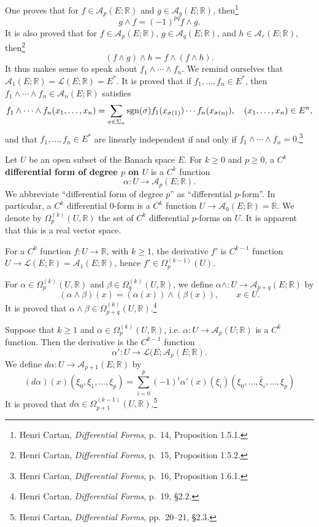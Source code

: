 \documentclass{article}
\newcommand{\sgn}{\ensuremath\mathrm{sgn}}
\theoremstyle{definition}
\theoremstyle{definition}
\begin{document}
One proves that for $f \in \mathscr{A}_p(E;\mathbb{R})$ and $g \in \mathscr{A}_q(E;\mathbb{R})$,
then\footnote{Henri Cartan,
{\em Differential Forms}, p.~14, Proposition 1.5.1.}
\[
g \wedge f = (-1)^{pq} f \wedge g.
\]
It is also proved that for $f \in \mathscr{A}_p(E;\mathbb{R})$, 
$g \in \mathscr{A}_q(E;\mathbb{R})$, and
$h \in \mathscr{A}_r(E;\mathbb{R})$, then\footnote{Henri Cartan,
{\em Differential Forms}, p.~15, Proposition 1.5.2.}
\[
(f \wedge g) \wedge h = f \wedge (f \wedge h).
\]
It thus makes sense to speak about $f_1 \wedge  \cdots \wedge f_n$. 
We remind ourselves that $\mathscr{A}_1(E;\mathbb{R})=\mathscr{L}(E;\mathbb{R})=E^*$.
It is proved that if $f_1,\ldots,f_n \in E^*$, then $f_1 \wedge \cdots \wedge f_n
\in \mathscr{A}_n(E;\mathbb{R})$ satisfies
\[
f_1 \wedge \cdots \wedge f_n (x_1,\ldots,x_n) = \sum_{\sigma \in \Sigma_n}
\sgn(\sigma) f_1(x_{\sigma(1)}) \cdots f_n(x_{\sigma(n)}),
\quad (x_1,\ldots,x_n) \in E^n,
\]
and that $f_1,\ldots,f_n \in E^*$ are linearly independent if and only if
$f_1 \wedge \cdots \wedge f_n=0$.\footnote{Henri Cartan,
{\em Differential Forms}, p.~16, Proposition 1.6.1.}


Let $U$ be an open subset of the Banach space $E$. 
For $k \geq 0$ and $p \geq 0$, a \textbf{$C^k$ differential form of degree $p$ on $U$}
is a $C^k$ function
\[
\alpha: U \to \mathscr{A}_p(E;\mathbb{R}). 
\]
We abbreviate ``differential form of degree $p$'' as ``differential $p$-form''.
In particular, a $C^k$ differential $0$-form is a $C^k$ function $U \to \mathscr{A}_0(E;\mathbb{R})
=\mathbb{R}$.
We denote by $\Omega_p^{(k)}(U,\mathbb{R})$ the set of $C^k$ differential
$p$-forms on $U$. It is apparent that this is a real vector space. 

For a $C^k$ function $f:U \to \mathbb{R}$, with $k \geq 1$,
the derivative $f'$ is $C^{k-1}$ function
$U \to \mathscr{L}(E;\mathbb{R})=\mathscr{A}_1(E;\mathbb{R})$, hence
$f' \in \Omega_p^{(k-1)}(U)$. 

For $\alpha \in \Omega_p^{(k)}(U,\mathbb{R})$ and 
$\beta \in \Omega_q^{(k)}(U,\mathbb{R})$, we define
$\alpha \wedge:U \to \mathscr{A}_{p+q}(E;\mathbb{R})$ by
\[
(\alpha \wedge \beta)(x) = (\alpha(x)) \wedge (\beta(x)), \qquad x \in U.
\]
It is proved that $\alpha \wedge \beta \in \Omega_{p+q}^{(k)}(U,\mathbb{R})$.\footnote{Henri Cartan,
{\em Differential Forms}, p.~19, \S 2.2.}

Suppose that $k \geq 1$ and $\alpha \in \Omega_p^{(k)}(U,\mathbb{R})$, i.e.
$\alpha:U \to \mathscr{A}_p(U;\mathbb{R})$ is a $C^k$ function. Then
the derivative is the $C^{k-1}$ function
\[
\alpha':U \to \mathscr{L}(E;\mathscr{A}_p(E;\mathbb{R}).
\]
We define $d\alpha:U \to \mathscr{A}_{p+1}(E;\mathbb{R})$ by
\[
(d\alpha)(x)(\xi_0,\xi_1,\ldots,\xi_p)
=\sum_{i=0}^p (-1)^i \alpha'(x)(\xi_i)(\xi_0,\ldots,\hat{\xi}_i,\ldots,\xi_p)
\]
It is proved that $d\alpha \in \Omega_{p+1}^{(k-1)}(U,\mathbb{R})$.\footnote{Henri Cartan,
{\em Differential Forms}, pp.~20--21, \S 2.3.}
\end{document}
